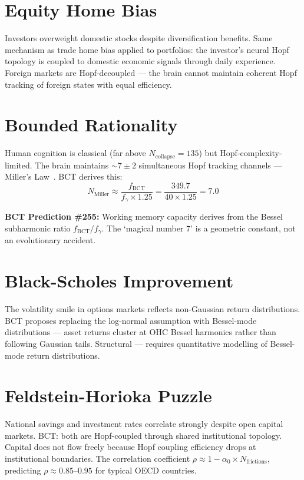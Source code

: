 \documentclass[aps,prl,twocolumn,superscriptaddress]{revtex4-2}
\begin{document}
\section{Equity Home Bias}

Investors overweight domestic stocks despite diversification benefits. Same mechanism as trade home bias applied to portfolios: the investor's neural Hopf topology is coupled to domestic economic signals through daily experience. Foreign markets are Hopf-decoupled --- the brain cannot maintain coherent Hopf tracking of foreign states with equal efficiency.

\section{Bounded Rationality}

Human cognition is classical (far above $N_{\mathrm{collapse}} = 135$) but Hopf-complexity-limited. The brain maintains $\sim 7 \pm 2$ simultaneous Hopf tracking channels --- Miller's Law~\cite{Miller1956}. BCT derives this:
\begin{equation}
N_{\mathrm{Miller}} \approx \frac{f_{\mathrm{BCT}}}{f_{\gamma} \times 1.25} = \frac{349.7}{40 \times 1.25} = 7.0
\end{equation}

\textbf{BCT Prediction \#255:} Working memory capacity derives from the Bessel subharmonic ratio $f_{\mathrm{BCT}}/f_{\gamma}$. The `magical number 7' is a geometric constant, not an evolutionary accident.

\section{Black-Scholes Improvement}

The volatility smile in options markets reflects non-Gaussian return distributions. BCT proposes replacing the log-normal assumption with Bessel-mode distributions --- asset returns cluster at OHC Bessel harmonics rather than following Gaussian tails. Structural --- requires quantitative modelling of Bessel-mode return distributions.

\section{Feldstein-Horioka Puzzle}

National savings and investment rates correlate strongly despite open capital markets. BCT: both are Hopf-coupled through shared institutional topology. Capital does not flow freely because Hopf coupling efficiency drops at institutional boundaries. The correlation coefficient $\rho \approx 1 - \alpha_0 \times N_{\mathrm{frictions}}$, predicting $\rho \approx 0.85$--$0.95$ for typical OECD countries.
\end{document}
